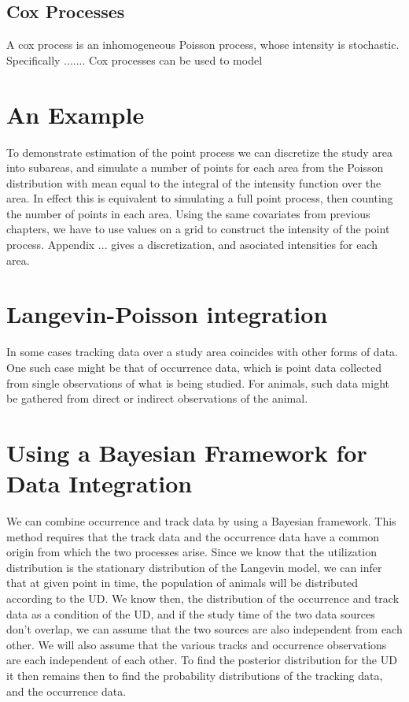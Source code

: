 \subsection{Cox Processes}
A cox process is an inhomogeneous Poisson process, whose intensity is stochastic. Specifically ....... Cox processes can be used to model 




\section{An Example}

To demonstrate estimation of the point process we can discretize the study area into subareas, and simulate a number of points for each area from the Poisson distribution with mean equal to the integral of the intensity function over the area. In effect this is equivalent to simulating a full point process, then counting the number of points in each area. Using the same covariates from previous chapters, we have to use values on a grid to construct the intensity of the point process. Appendix ... gives a discretization, and asociated intensities for each area.












\section{Langevin-Poisson integration}

In some cases tracking data over a study area coincides with other forms of data. One such case might be that of occurrence data, which is point data collected from single observations of what is being studied. For animals, such data might be gathered from direct or indirect observations of the animal.

\section{Using a Bayesian Framework for Data Integration}
We can combine occurrence and track data by using a Bayesian framework. This method requires that the track data and the occurrence data have a common origin from which the two processes arise. Since we know that the utilization distribution is the stationary distribution of the Langevin model, we can infer that at given point in time, the population of animals will be distributed according to the UD. We know then, the distribution of the occurrence and track data as a condition of the UD, and if the study time of the two data sources don't overlap, we can assume that the two sources are also independent from each other. We will also assume that the various tracks and occurrence observations are each independent of each other. To find the posterior distribution for the UD it then remains then to find the probability distributions of the tracking data, and the occurrence data. 

